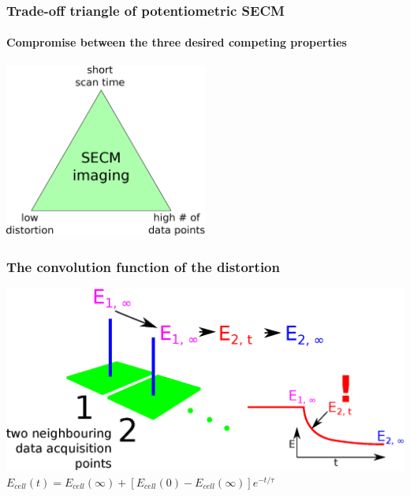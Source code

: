 \documentclass{beamer}
\begin{document}

\begin{frame}
\frametitle{Trade-off triangle of potentiometric SECM}
\framesubtitle{Compromise between the three desired competing properties}
\begin{center}
\includegraphics[width=0.5\textwidth]{trade-off.eps}
\end{center}
\end{frame}

\begin{frame}
\frametitle{The convolution function of the distortion}
\centering	
\includegraphics[width=1\textwidth]{t.eps}\\
\vfill
$E_{cell}(t) = E_{cell}(\infty) + [E_{cell}(0) - E_{cell}(\infty)]e^{-t/\tau}$\\
\vfill
\end{frame}
\end{document}
